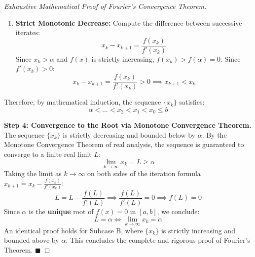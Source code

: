 \begin{proof}[Exhaustive Mathematical Proof of Fourier's Convergence Theorem]
\begin{enumerate}
    \item \textbf{Strict Monotonic Decrease:}
    Compute the difference between successive iterates:
    \begin{equation}
        x_k - x_{k+1} = \frac{f(x_k)}{f'(x_k)}
    \end{equation}
    Since $x_k > \alpha$ and $f(x)$ is strictly increasing, $f(x_k) > f(\alpha) = 0$. Since $f'(x_k) > 0$:
    \begin{equation}
        x_k - x_{k+1} = \frac{f(x_k)}{f'(x_k)} > 0 \implies \boxed{x_{k+1} < x_k}
    \end{equation}
\end{enumerate}
Therefore, by mathematical induction, the sequence $\{x_k\}$ satisfies:
\begin{equation}
    \alpha < \dots < x_2 < x_1 < x_0 \le b
\end{equation}

\medskip
\noindent\textbf{Step 4: Convergence to the Root via Monotone Convergence Theorem.} \\
The sequence $\{x_k\}$ is strictly decreasing and bounded below by $\alpha$. By the Monotone Convergence Theorem of real analysis, the sequence is guaranteed to converge to a finite real limit $L$:
\begin{equation}
    \lim_{k \to \infty} x_k = L \ge \alpha
\end{equation}
Taking the limit as $k \to \infty$ on both sides of the iteration formula $x_{k+1} = x_k - \frac{f(x_k)}{f'(x_k)}$:
\begin{equation}
    L = L - \frac{f(L)}{f'(L)} \implies \frac{f(L)}{f'(L)} = 0 \implies f(L) = 0
\end{equation}
Since $\alpha$ is the \textbf{unique} root of $f(x) = 0$ in $[a, b]$, we conclude:
\begin{equation}
    \boxed{L = \alpha \iff \lim_{k \to \infty} x_k = \alpha}
\end{equation}
An identical proof holds for Subcase B, where $\{x_k\}$ is strictly increasing and bounded above by $\alpha$.
This concludes the complete and rigorous proof of Fourier's Theorem. $\blacksquare$
\end{proof}

